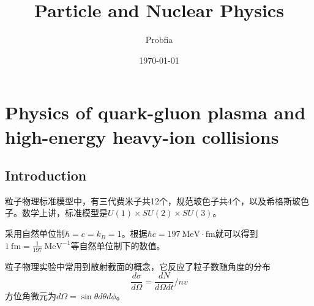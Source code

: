 \documentclass[a4paper,11pt]{ctexart}
\title{Particle and Nuclear Physics}
\author{Probfia}
\date{\today}
\newcommand{\beq}{\begin{equation}}
\newcommand{\eeq}{\end{equation}}
\newcommand{\unit}[1]{\mathrm{\ #1}}
\begin{document}
\maketitle
\tableofcontents
\section{Physics of quark-gluon plasma and high-energy heavy-ion collisions}
\subsection{Introduction}
粒子物理标准模型中，有三代费米子共12个，规范玻色子共4个，以及希格斯玻色子。数学上讲，标准模型是$U(1)\times SU(2) \times SU(3)$。\par
采用自然单位制$\hbar = c = k_B = 1$。根据$\hbar c = 197\unit{MeV \cdot fm}$就可以得到$1\unit{fm} = \frac{1}{197}\unit{MeV^{-1}}$等自然单位制下的数值。\par
粒子物理实验中常用到散射截面的概念，它反应了粒子数随角度的分布
\beq
\frac{d \sigma}{d \varOmega} = \frac{dN}{d\varOmega dt}/nv
\eeq
方位角微元为$d\varOmega = \sin \theta d \theta d \phi$。
\end{document}
